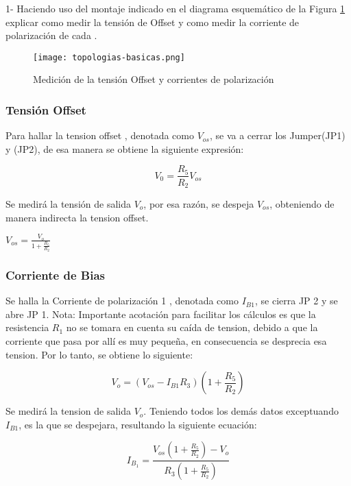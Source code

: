 1- Haciendo uso del montaje indicado en el diagrama esquemático de la Figura \ref{fig:offset-y-bias} explicar como medir la tensión de
Offset y como medir la corriente de polarización de cada
.

\begin{figure}[ht]
    \centering
    \texttt{[image: topologias-basicas.png]}
    \caption{Medición de la tensión Offset y corrientes de polarización}
    \label{fig:offset-y-bias}
\end{figure}

\subsubsection{Tensión Offset}

Para hallar la tension offset  , denotada como $V_{os}$, se va a cerrar los Jumper(JP1) y
(JP2), de esa manera se obtiene la siguiente expresión: 

\begin{equation}
    V_0=\frac{R_5}{R_2}V_{os}
\end{equation}

Se medirá la tensión de salida  $V_o$, por esa razón, se despeja  $V_{os}$, obteniendo de manera indirecta la tension offset.

$V_{os}=\frac{V_o}{1+\frac{R_5}{R_2}}$

\subsubsection{Corriente de Bias}

 Se halla la Corriente de polarización 1 , denotada como $I_{B1}$, se cierra JP 2 y se abre JP 1. Nota: Importante acotación para facilitar los cálculos es que la resistencia  $R_1$ no se tomara en cuenta su caída de tension, debido a que la corriente que pasa por allí es muy pequeña, en consecuencia se desprecia esa tension. Por lo tanto, se obtiene lo siguiente:

 \begin{equation}
    V_o = (V_{os} - I_{B1}R_3)(1 + \frac{R_5}{R_2})
 \end{equation}

 Se medirá la tension de salida  $V_o$. Teniendo todos los demás datos exceptuando $I_{B1}$, es la que se despejara, resultando la siguiente ecuación:


 \begin{equation}
 I_{B_1} = \frac{V_{os} \left( 1 + \frac{R_5}{R_2} \right) - V_o}{R_3 \left( 1 + \frac{R_5}{R_2} \right)}
 \end{equation}

